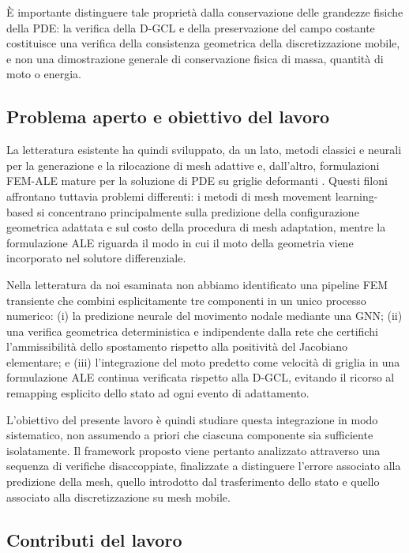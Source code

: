 È importante distinguere tale proprietà dalla conservazione delle grandezze fisiche della PDE: la verifica della D-GCL e della preservazione del campo costante costituisce una verifica della consistenza geometrica della discretizzazione mobile, e non una dimostrazione generale di conservazione fisica di massa, quantità di moto o energia.

\subsection{Problema aperto e obiettivo del lavoro}

La letteratura esistente ha quindi sviluppato, da un lato, metodi classici e neurali per la generazione e la rilocazione di mesh adattive e, dall'altro, formulazioni FEM-ALE mature per la soluzione di PDE su griglie deformanti \citep{budd2009adaptivity,song2022m2n,hu2024better,zhang2024towards,rowbottom2024g}. Questi filoni affrontano tuttavia problemi differenti: i metodi di mesh movement learning-based si concentrano principalmente sulla predizione della configurazione geometrica adattata e sul costo della procedura di mesh adaptation, mentre la formulazione ALE riguarda il modo in cui il moto della geometria viene incorporato nel solutore differenziale.

Nella letteratura da noi esaminata non abbiamo identificato una pipeline FEM transiente che combini esplicitamente tre componenti in un unico processo numerico: 
(i) la predizione neurale del movimento nodale mediante una GNN;
(ii) una verifica geometrica deterministica e indipendente dalla rete che certifichi l'ammissibilità dello spostamento rispetto alla positività del Jacobiano elementare;
e (iii) l'integrazione del moto predetto come velocità di griglia in una formulazione ALE continua verificata rispetto alla D-GCL, evitando il ricorso al remapping esplicito dello stato ad ogni evento di adattamento.

L'obiettivo del presente lavoro è quindi studiare questa integrazione in modo sistematico, non assumendo a priori che ciascuna componente sia sufficiente isolatamente. Il framework proposto viene pertanto analizzato attraverso una sequenza di verifiche disaccoppiate, finalizzate a distinguere l'errore associato alla predizione della mesh, quello introdotto dal trasferimento dello stato e quello associato alla discretizzazione su mesh mobile.

\subsection{Contributi del lavoro}


